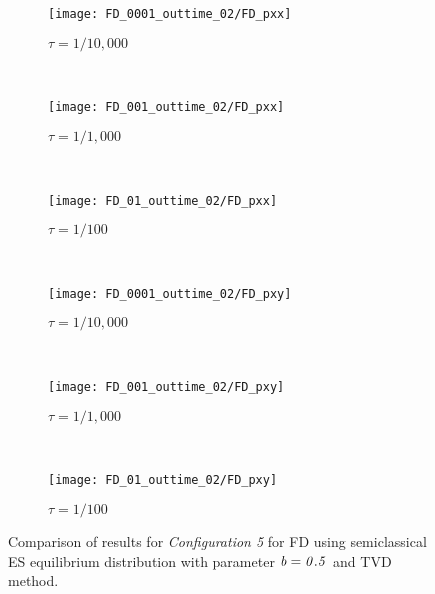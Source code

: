 \documentclass{rsproca}%
\begin{document}
\begin{figure}
        \centering
        \begin{subfigure}[b]{0.32\textwidth}
                \centering
                \texttt{[image: FD\_0001\_outtime\_02/FD\_pxx]}
                \caption{$\tau = 1/10,000$}
                \label{fig:5ESBGK_FD_pxx_tau0001}
        \end{subfigure}%
        ~ %
        \begin{subfigure}[b]{0.32\textwidth}
                \centering
                \texttt{[image: FD\_001\_outtime\_02/FD\_pxx]}
                \caption{$\tau = 1/1,000$}
                \label{fig:5ESBGK_FD_pxx_tau001}
        \end{subfigure}
        ~ %
        \begin{subfigure}[b]{0.32\textwidth}
                \centering
                \texttt{[image: FD\_01\_outtime\_02/FD\_pxx]}
                \caption{$\tau = 1/100$}
                \label{fig:5ESBGK_FD_pxx_tau01}
        \end{subfigure}
				~ %
        \begin{subfigure}[b]{0.32\textwidth}
                \centering
                \texttt{[image: FD\_0001\_outtime\_02/FD\_pxy]}
                \caption{$\tau = 1/10,000$}
                \label{fig:5ESBGK_FD_pxy_tau0001}
        \end{subfigure}
        ~ %
        \begin{subfigure}[b]{0.32\textwidth}
                \centering
                \texttt{[image: FD\_001\_outtime\_02/FD\_pxy]}
                \caption{$\tau = 1/1,000$}
                \label{fig:5ESBGK_FD_pxy_tau001}
        \end{subfigure}
				~ %
        \begin{subfigure}[b]{0.32\textwidth}
                \centering
                \texttt{[image: FD\_01\_outtime\_02/FD\_pxy]}
                \caption{$\tau = 1/100$}
                \label{fig:5ESBGK_FD_pxy_tau01}
        \end{subfigure}
        \caption{Comparison of results for \emph{Configuration 5} for FD using semiclassical ES equilibrium distribution with parameter $\it{b=0.5}$ and TVD method.}
				\label{fig:FD_config5_Ptensor_comparison}
\end{figure}
\end{document}
